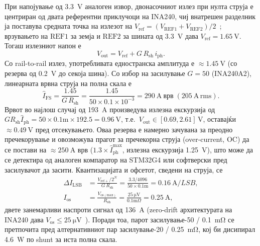 \documentclass[journal,onecolumn,11pt]{IEEEtran}
\newcommand{\Rshunt}{R_{\mathrm{sh}}}
\begin{document}
При напојување од \SI{3.3}{\volt} аналоген извор, двонасочниот излез при нулта струја е центриран од
двата референтни приклучоци на INA240, чиј внатрешен разделник ја поставува средната точка на излезот
на $V_{\mathrm{ref}}=(V_{\mathrm{REF1}}+V_{\mathrm{REF2}})/2$~\cite{ina240ds}; врзувањето на
$\mathrm{REF1}$ за земја и $\mathrm{REF2}$ за шината од \SI{3.3}{\volt} дава
$V_{\mathrm{ref}}=\SI{1.65}{\volt}$. Тогаш излезниот напон е
\begin{equation}
V_{\mathrm{out}} = V_{\mathrm{ref}} + G\,\Rshunt\,i_{\mathrm{ph}} .
\label{eq:csaout}
\end{equation}
Со rail-to-rail излез, употребливата едностранска амплитуда е $\approx\SI{1.45}{\volt}$ (со резерва од
\SI{0.2}{\volt} до секоја шина). Со избор на засилување $G=50$ (INA240A2), линеарната врвна струја на
полна скала е
\begin{equation}
\hat I_{\mathrm{FS}} = \frac{1.45}{G\,\Rshunt}
   = \frac{1.45}{50\times 0.1\times10^{-3}} = \SI{290}{\ampere}\ \text{врв}\;(\SI{205}{\ampere}\,\text{rms}).
\end{equation}
Врвот во најлош случај од \SI{193}{\ampere} произведува излезна екскурзија од
$G\Rshunt\hat I_{\mathrm{ph}}=50\times0.1\text{m}\times192.5=\SI{0.96}{\volt}$, т.е.\
$V_{\mathrm{out}}\in[0.69,2.61]\,\si{\volt}$, оставајќи $\approx\SI{0.49}{\volt}$ пред отсекувањето.
Оваа резерва е намерно зачувана за преодно пречекорување и овозможува прагот за пречекорна струја
(over-current, OC) да се постави на $\approx\SI{250}{\ampere}$ врв ($1.3\times\hat I_{\mathrm{ph}}^{\max}$,
излезна екскурзија \SI{1.25}{\volt}), што може да се детектира од аналоген компаратор на STM32G4 или
софтверски пред засилувачот да засити. Квантизацијата и офсетот, сведени на струја, се
\begin{align}
\Delta I_{\mathrm{LSB}} &= \frac{V_{\mathrm{ref+}}/2^{N}}{G\,\Rshunt}
   = \frac{3.3/4096}{50\times0.1\text{m}} = \SI{0.16}{\ampere/LSB},\\
I_{\mathrm{os}} &= \frac{V_{\mathrm{os(max)}}}{\Rshunt} = \frac{\SI{25}{\micro\volt}}{0.1\text{m}\Omega}
   = \SI{0.25}{\ampere},
\end{align}
двете занемарливи наспроти сигнал од \SI{136}{\ampere} (zero-drift архитектурата на INA240 дава
$V_{\mathrm{os}}\le\SI{25}{\micro\volt}$~\cite{ina240ds}). Поради тоа, парот засилување-50 /
\SI{0.1}{\milli\ohm} се претпочита пред алтернативниот пар засилување-20 / \SI{0.25}{\milli\ohm}, кој
би дисипирал \SI{4.6}{\watt} по shunt за иста полна скала.
\end{document}
